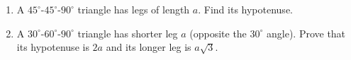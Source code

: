 \begin{enumerate}
\item[(a)] A $45^\circ$-$45^\circ$-$90^\circ$ triangle has legs of length $a$. Find its hypotenuse.
\item[(b)] A $30^\circ$-$60^\circ$-$90^\circ$ triangle has shorter leg $a$ (opposite the $30^\circ$ angle). Prove that its hypotenuse is $2a$ and its longer leg is $a\sqrt3$.
\end{enumerate}
